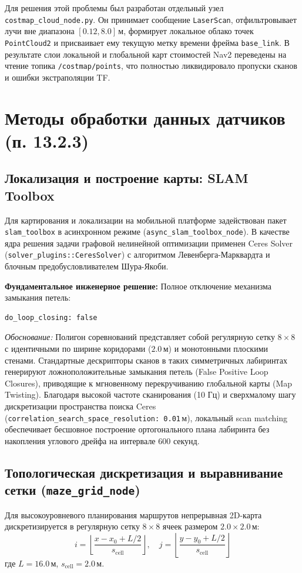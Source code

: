 \documentclass[a4paper,11pt]{article}
\begin{document}
Для решения этой проблемы был разработан отдельный узел \texttt{costmap\_cloud\_node.py}. Он принимает сообщение \texttt{LaserScan}, отфильтровывает лучи вне диапазона $[0.12, 8.0]$\,м, формирует локальное облако точек \texttt{PointCloud2} и присваивает ему текущую метку времени фрейма \texttt{base\_link}. В результате слои локальной и глобальной карт стоимостей Nav2 переведены на чтение топика \texttt{/costmap/points}, что полностью ликвидировало пропуски сканов и ошибки экстраполяции TF.

\section{Методы обработки данных датчиков (п. 13.2.3)}

\subsection{Локализация и построение карты: SLAM Toolbox}
Для картирования и локализации на мобильной платформе задействован пакет \texttt{slam\_toolbox} в асинхронном режиме (\texttt{async\_slam\_toolbox\_node}). В качестве ядра решения задачи графовой нелинейной оптимизации применен Ceres Solver (\texttt{solver\_plugins::CeresSolver}) с алгоритмом Левенберга-Марквардта и блочным предобусловливателем Шура-Якоби.

\textbf{Фундаментальное инженерное решение:} Полное отключение механизма замыкания петель:
\begin{lstlisting}[language=bash]
do_loop_closing: false
\end{lstlisting}
\textit{Обоснование:} Полигон соревнований представляет собой регулярную сетку $8 \times 8$ с идентичными по ширине коридорами ($2.0$\,м) и монотонными плоскими стенами. Стандартные дескрипторы сканов в таких симметричных лабиринтах генерируют ложноположительные замыкания петель (False Positive Loop Closures), приводящие к мгновенному перекручиванию глобальной карты (Map Twisting). Благодаря высокой частоте сканирования (10 Гц) и сверхмалому шагу дискретизации пространства поиска Ceres (\texttt{correlation\_search\_space\_resolution: 0.01}\,м), локальный scan matching обеспечивает бесшовное построение ортогонального плана лабиринта без накопления углового дрейфа на интервале 600 секунд.

\subsection{Топологическая дискретизация и выравнивание сетки (\texttt{maze\_grid\_node})}
Для высокоуровневого планирования маршрутов непрерывная 2D-карта дискретизируется в регулярную сетку $8 \times 8$ ячеек размером $2.0 \times 2.0$\,м:
\begin{equation}
i = \left\lfloor \frac{x - x_0 + L/2}{s_{\text{cell}}} \right\rfloor, \quad j = \left\lfloor \frac{y - y_0 + L/2}{s_{\text{cell}}} \right\rfloor
\end{equation}
где $L = 16.0$\,м, $s_{\text{cell}} = 2.0$\,м.
\end{document}
